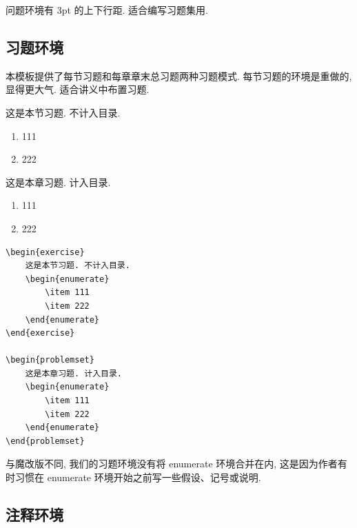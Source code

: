 \documentclass[../book.tex]{subfiles}
\begin{document}
问题环境有 3pt 的上下行距. 适合编写习题集用.

    \subsection{习题环境}

本模板提供了每节习题和每章章末总习题两种习题模式. 每节习题的环境是重做的, 显得更大气. 适合讲义中布置习题.

\begin{exercise}
    这是本节习题. 不计入目录. 
    \begin{enumerate}
        \item 111
        \item 222
    \end{enumerate}
\end{exercise}

\begin{problemset}
    这是本章习题. 计入目录.
    \begin{enumerate}
        \item 111
        \item 222
    \end{enumerate}
\end{problemset}

\begin{lstlisting}
\begin{exercise}
    这是本节习题. 不计入目录.
    \begin{enumerate}
        \item 111
        \item 222
    \end{enumerate}
\end{exercise}

\begin{problemset}
    这是本章习题. 计入目录.
    \begin{enumerate}
        \item 111
        \item 222
    \end{enumerate}
\end{problemset}
\end{lstlisting}

与魔改版不同, 我们的习题环境没有将 enumerate 环境合并在内, 这是因为作者有时习惯在 enumerate 环境开始之前写一些假设、记号或说明.

    \subsection{注释环境}
\end{document}

